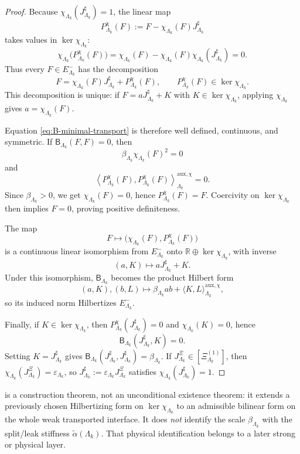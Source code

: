 \documentclass[11pt]{article}
\begin{document}
\begin{proof}
Because \(\chi_{\Lambda_k}(J^\sharp_{\Lambda_k})=1\), the linear map
\[
P^\chi_{\Lambda_k}(F)
:=
F-\chi_{\Lambda_k}(F)J^\sharp_{\Lambda_k}
\]
takes values in \(\ker\chi_{\Lambda_k}\):
\[
\chi_{\Lambda_k}\!\big(P^\chi_{\Lambda_k}(F)\big)
=
\chi_{\Lambda_k}(F)-\chi_{\Lambda_k}(F)\chi_{\Lambda_k}(J^\sharp_{\Lambda_k})
=
0.
\]
Thus every \(F\in E^-_{\Lambda_k}\) has the decomposition
\[
F=\chi_{\Lambda_k}(F)J^\sharp_{\Lambda_k}+P^\chi_{\Lambda_k}(F),
\qquad
P^\chi_{\Lambda_k}(F)\in\ker\chi_{\Lambda_k}.
\]
This decomposition is unique: if \(F=aJ^\sharp_{\Lambda_k}+K\) with \(K\in\ker\chi_{\Lambda_k}\),
applying \(\chi_{\Lambda_k}\) gives \(a=\chi_{\Lambda_k}(F)\).

Equation \eqref{eq:B-minimal-transport} is therefore well defined, continuous, and symmetric.
If \(\mathsf B_{\Lambda_k}(F,F)=0\), then
\[
\beta_{\Lambda_k}\chi_{\Lambda_k}(F)^2=0
\]
and
\[
\left\langle
P^\chi_{\Lambda_k}(F),P^\chi_{\Lambda_k}(F)
\right\rangle^{\mathrm{aux},\chi}_{\Lambda_k}
=
0.
\]
Since \(\beta_{\Lambda_k}>0\), we get \(\chi_{\Lambda_k}(F)=0\), hence
\(P^\chi_{\Lambda_k}(F)=F\). Coercivity on \(\ker\chi_{\Lambda_k}\) then implies \(F=0\), proving
positive definiteness.

The map
\[
F\longmapsto
\big(
\chi_{\Lambda_k}(F),P^\chi_{\Lambda_k}(F)
\big)
\]
is a continuous linear isomorphism from \(E^-_{\Lambda_k}\) onto
\(
\mathbb R\oplus\ker\chi_{\Lambda_k}
\),
with inverse
\[
(a,K)\longmapsto aJ^\sharp_{\Lambda_k}+K.
\]
Under this isomorphism, \(\mathsf B_{\Lambda_k}\) becomes the product Hilbert form
\[
(a,K),(b,L)\longmapsto
\beta_{\Lambda_k}ab+\langle K,L\rangle^{\mathrm{aux},\chi}_{\Lambda_k},
\]
so its induced norm Hilbertizes \(E^-_{\Lambda_k}\).

Finally, if \(K\in\ker\chi_{\Lambda_k}\), then \(P^\chi_{\Lambda_k}(J^\sharp_{\Lambda_k})=0\) and
\(\chi_{\Lambda_k}(K)=0\), hence
\[
\mathsf B_{\Lambda_k}(J^\sharp_{\Lambda_k},K)=0.
\]
Setting \(K=J^\sharp_{\Lambda_k}\) gives
\(
\mathsf B_{\Lambda_k}(J^\sharp_{\Lambda_k},J^\sharp_{\Lambda_k})=\beta_{\Lambda_k}
\).
If \(J^\Xi_{\Lambda_k}\in[\Xi^{(1)}_{\Lambda_k}]\), then
\(
\chi_{\Lambda_k}(J^\Xi_{\Lambda_k})=\varepsilon_{\Lambda_k}
\),
so
\(
J^\sharp_{\Lambda_k}:=\varepsilon_{\Lambda_k}J^\Xi_{\Lambda_k}
\)
satisfies
\(
\chi_{\Lambda_k}(J^\sharp_{\Lambda_k})=1
\).
\end{proof}

\begin{remark}
\label{rem:minimal-transport-calibration-scope}
 is a construction theorem, not an unconditional existence
theorem: it extends a previously chosen Hilbertizing form on \(\ker\chi_{\Lambda_k}\) to an
admissible bilinear form on the whole weak transported interface.
It does \emph{not} identify the scale
\(\beta_{\Lambda_k}\) with the split/leak stiffness \(\widetilde\alpha(\Lambda_k)\).
That physical identification belongs to a later strong or physical layer.
\end{remark}
\end{document}
